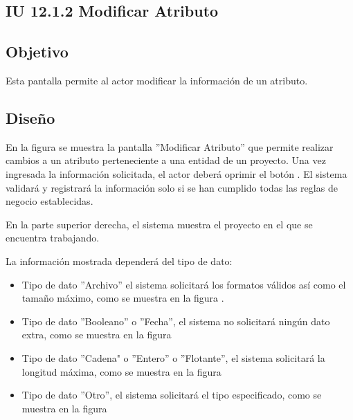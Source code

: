 \subsection{IU 12.1.2 Modificar Atributo}

\subsection{Objetivo}
	Esta pantalla permite al actor modificar la información de un atributo.
\subsection{Diseño}
	En la figura  se muestra la pantalla ''Modificar Atributo'' que permite realizar cambios a un atributo perteneciente a una entidad de un proyecto.
	Una vez ingresada la información solicitada, el actor deberá oprimir el botón  . El sistema validará y registrará la información solo si se han cumplido todas las reglas de negocio establecidas.
	
	En la parte superior derecha, el sistema muestra el proyecto en el que se encuentra trabajando.
	
	
	La información mostrada dependerá del tipo de dato:
	\begin{itemize}
		\item Tipo de dato ''Archivo'' el sistema solicitará los formatos válidos así como el tamaño máximo, como se muestra en la figura .
		\item Tipo de dato ''Booleano'' o ''Fecha'', el sistema no solicitará ningún dato extra, como se muestra en la figura 
		\item Tipo de dato ''Cadena" o ''Entero'' o ''Flotante'', el sistema solicitará la longitud máxima, como se muestra en la figura 
		\item Tipo de dato ''Otro'', el sistema solicitará el tipo especificado, como se muestra en la figura 
	\end{itemize}

